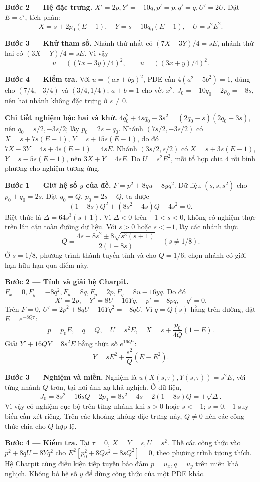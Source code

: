 \textbf{Bước 2 — Hệ đặc trưng.} $X'=2p,Y'=-10q,p'=p,q'=q,U'=2U$. Đặt $E=e^\tau$, tích phân:
\[X=s+2p_0(E-1),\quad Y=s-10q_0(E-1),\quad U=s^2E^2.\]

\textbf{Bước 3 — Khử tham số.} Nhánh thứ nhất có $(7X-3Y)/4=sE$, nhánh thứ hai có $(3X+Y)/4=sE$. Vì vậy
\[u=((7x-3y)/4)^2,\qquad u=((3x+y)/4)^2.\]

\textbf{Bước 4 — Kiểm tra.} Với $u=(ax+by)^2$, PDE cần $4(a^2-5b^2)=1$, đúng cho $(7/4,-3/4)$ và $(3/4,1/4)$; $a+b=1$ cho vết $x^2$. $J_0=-10q_0-2p_0=\pm8s$, nên hai nhánh không đặc trưng ở $s\ne0$.

\textbf{Chi tiết nghiệm bậc hai và khử.} $4q_0^2+4sq_0-3s^2=(2q_0-s)(2q_0+3s)$, nên $q_0=s/2,-3s/2$; lấy $p_0=2s-q_0$. Nhánh $(7s/2,-3s/2)$ có $X=s+7s(E-1)$, $Y=s+15s(E-1)$, do đó $7X-3Y=4s+4s(E-1)=4sE$. Nhánh $(3s/2,s/2)$ có $X=s+3s(E-1)$, $Y=s-5s(E-1)$, nên $3X+Y=4sE$. Do $U=s^2E^2$, mỗi tổ hợp chia $4$ rồi bình phương cho nghiệm tương ứng.

\textbf{Bước 1 — Giữ hệ số $y$ của đề.} $F=p^2+8qu-8yq^2$. Dữ liệu $(s,s,s^2)$ cho $p_0+q_0=2s$. Đặt $q_0=Q$, $p_0=2s-Q$, ta được
\[(1-8s)Q^2+(8s^2-4s)Q+4s^2=0.\]
Biệt thức là $\Delta=64s^3(s+1)$. Vì $\Delta<0$ trên $-1<s<0$, không có nghiệm thực trên lân cận toàn đường dữ liệu. Với $s>0$ hoặc $s<-1$, lấy các nhánh thực
\[Q=\frac{4s-8s^2\pm8\sqrt{s^3(s+1)}}{2(1-8s)}\quad(s\ne1/8).\]
Ở $s=1/8$, phương trình thành tuyến tính và cho $Q=1/6$; chọn nhánh có giới hạn hữu hạn qua điểm này.

\textbf{Bước 2 — Tính và giải hệ Charpit.} $F_x=0,F_y=-8q^2,F_u=8q,F_p=2p,F_q=8u-16yq$. Do đó
\[X'=2p,\quad Y'=8U-16Yq,\quad p'=-8pq,\quad q'=0.\]
Trên $F=0$, $U'=2p^2+8qU-16Yq^2=-8qU$. Vì $q=Q(s)$ hằng trên đường, đặt $E=e^{-8Q\tau}$:
\[p=p_0E,\quad q=Q,\quad U=s^2E,\quad X=s+\frac{p_0}{4Q}(1-E).\]
Giải $Y'+16QY=8s^2E$ bằng thừa số $e^{16Q\tau}$:
\[Y=sE^2+\frac{s^2}{Q}(E-E^2).\]

\textbf{Bước 3 — Nghiệm và miền.} Nghiệm là $u(X(s,\tau),Y(s,\tau))=s^2E$, với từng nhánh $Q$ trơn, tại nơi ánh xạ khả nghịch. Ở dữ liệu,
\[J_0=8s^2-16sQ-2p_0=8s^2-4s+2(1-8s)Q=\pm\sqrt\Delta.\]
Vì vậy có nghiệm cục bộ trên từng nhánh khi $s>0$ hoặc $s<-1$; $s=0,-1$ suy biến cần xét riêng. Trên các khoảng không đặc trưng này, $Q\ne0$ nên các công thức chia cho $Q$ hợp lệ.

\textbf{Bước 4 — Kiểm tra.} Tại $\tau=0$, $X=Y=s,U=s^2$. Thế các công thức vào $p^2+8qU-8Yq^2$ cho $E^2[p_0^2+8Qs^2-8sQ^2]=0$, theo phương trình tương thích. Hệ Charpit cùng điều kiện tiếp tuyến bảo đảm $p=u_x,q=u_y$ trên miền khả nghịch. Không bỏ hệ số $y$ để dùng công thức của một PDE khác.

